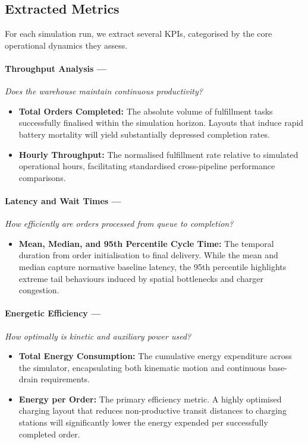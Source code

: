 \documentclass[conference]{IEEEtran}
\begin{document}
\subsection{Extracted Metrics}
\label{sec:metrics}

For each simulation run, we extract several KPIs, categorised by the core operational dynamics they assess.

\paragraph{Throughput Analysis ---}\textit{Does the warehouse maintain continuous productivity?}
\begin{itemize}
  \item \textbf{Total Orders Completed:} The absolute volume of fulfillment tasks successfully finalised within the simulation horizon. Layouts that induce rapid battery mortality will yield substantially depressed completion rates.
  \item \textbf{Hourly Throughput:} The normalised fulfillment rate relative to simulated operational hours, facilitating standardised cross-pipeline performance comparisons.
\end{itemize}

\paragraph{Latency and Wait Times ---}\textit{How efficiently are orders processed from queue to completion?}
\begin{itemize}
  \item \textbf{Mean, Median, and 95th Percentile Cycle Time:} The temporal duration from order initialisation to final delivery. While the mean and median capture normative baseline latency, the 95th percentile highlights extreme tail behaviours induced by spatial bottlenecks and charger congestion.
\end{itemize}

\paragraph{Energetic Efficiency ---}\textit{How optimally is kinetic and auxiliary power used?}
\begin{itemize}
  \item \textbf{Total Energy Consumption:} The cumulative energy expenditure across the simulator, encapsulating both kinematic motion and continuous base-drain requirements.
  \item \textbf{Energy per Order:} The primary efficiency metric. A highly optimised charging layout that reduces non-productive transit distances to charging stations will significantly lower the energy expended per successfully completed order.
\end{itemize}
\end{document}
